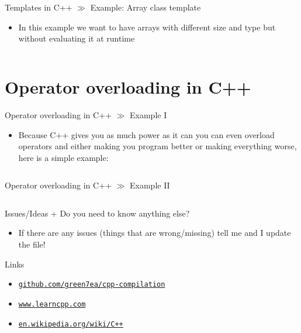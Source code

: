 \documentclass[10pt]{beamer}
\newcommand{\urlCustom}[1]{\href{https://#1}{\textcolor{greyCustom}{\texttt{#1}}}}
\begin{document}
\begin{frame}{Templates in C++ $\gg$ Example: Array class template}
\begin{itemize}
	\item In this example we want to have arrays with different size and type but without evaluating it at runtime
	\inputminted[bgcolor=lightGreyCustom,fontsize=\scriptsize ]{cpp}{./resources/templates/array_class_template_example.cpp}
\end{itemize}
\end{frame}

\section{Operator overloading in C++}

\begin{frame}{Operator overloading in C++ $\gg$ Example I}
\begin{itemize}
	\item Because C++ gives you as much power as it can you can even overload operators and either making you program better or making everything worse, here is a simple example:
	\inputminted[bgcolor=lightGreyCustom,fontsize=\scriptsize,lastline=18]{cpp}{./resources/operator_overloading.cpp}
\end{itemize}
\end{frame}

\begin{frame}{Operator overloading in C++ $\gg$ Example II}
\begin{itemize}
	\inputminted[bgcolor=lightGreyCustom,fontsize=\scriptsize,firstline=19]{cpp}{./resources/operator_overloading.cpp}
\end{itemize}
\end{frame}

\begin{frame}{Issues/Ideas + Do you need to know anything else?}
	\begin{itemize}
		\item If there are any issues (things that are wrong/missing) tell me and I update the file!
	\end{itemize}
\end{frame}

\begin{frame}{Links}
	\begin{itemize}
		\item\urlCustom{github.com/green7ea/cpp-compilation}
		\item\urlCustom{www.learncpp.com}
		\item\urlCustom{en.wikipedia.org/wiki/C++}
		
	\end{itemize}
	\begin{center}\doclicenseThis\end{center}
\end{frame}
\end{document}
